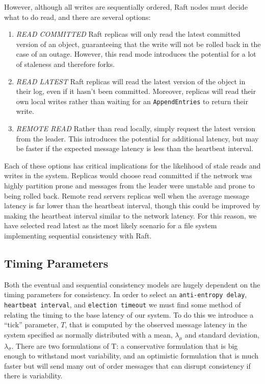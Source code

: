 \documentclass[10pt,conference,compsocconf,letterpaper]{IEEEtran}
\begin{document}
However, although all writes are sequentially ordered, Raft nodes must decide what to do read, and there are several options:

\begin{enumerate}
    \item \textit{READ COMMITTED} Raft replicas will only read the latest committed version of an object, guaranteeing that the write will not be rolled back in the case of an outage. However, this read mode introduces the potential for a lot of staleness and therefore forks.
    \item \textit{READ LATEST} Raft replicas will read the latest version of the object in their log, even if it hasn't been committed. Moreover, replicas will read their own local writes rather than waiting for an \texttt{AppendEntries} to return their write.
    \item \textit{REMOTE READ} Rather than read locally, simply request the latest version from the leader. This introduces the potential for additional latency, but may be faster if the expected message latency is less than the heartbeat interval.
\end{enumerate}

Each of these options has critical implications for the likelihood of stale reads and writes in the system. Replicas would choose read committed if the network was highly partition prone and messages from the leader were unstable and prone to being rolled back. Remote read servers replicas well when the average message latency is far lower than the heartbeat interval, though this could be improved by making the heartbeat interval similar to the network latency. For this reason, we have selected read latest as the most likely scenario for a file system implementing sequential consistency with Raft.

\subsection{Timing Parameters}

Both the eventual and sequential consistency models are hugely dependent on the timing parameters for consistency. In order to select an \texttt{anti-entropy delay}, \texttt{heartbeat interval}, and \texttt{election timeout} we must find some method of relating the timing to the base latency of our system. To do this we introduce a ``tick'' parameter, $T$, that is computed by the observed message latency in the system specified as normally distributed with a mean, $\lambda_{\mu}$ and standard deviation, $\lambda_{\sigma}$. There are two formulations of T: a conservative formulation that is big enough to withstand most variability, and an optimistic formulation that is much faster but will send many out of order messages that can disrupt consistency if there is variability.
\end{document}
